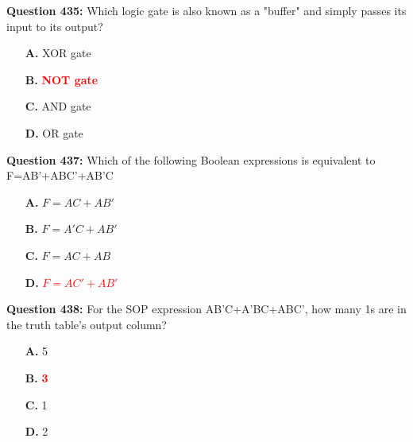 \documentclass[12pt,a4paper]{article}
\begin{document}
\vspace{0.5cm}

\vspace{0.5cm}

\textbf{Question 435:} Which logic gate is also known as a "buffer" and simply passes its input to its output?

\begin{itemize}
    \item[\textbf{A.}] XOR gate
    \item[\textbf{B.}] \textcolor{red}{\textbf{NOT gate}}
    \item[\textbf{C.}] AND gate
    \item[\textbf{D.}] OR gate
\end{itemize}

\vspace{0.5cm}

\vspace{0.5cm}

\textbf{Question 437:} Which of the following Boolean expressions is equivalent to F=AB'+ABC'+AB'C

\begin{itemize}
    \item[\textbf{A.}] $F = AC + AB'$
    \item[\textbf{B.}] $F = A'C + AB'$
    \item[\textbf{C.}] $F = AC + AB$
    \item[\textbf{D.}] \textcolor{red}{\textbf{$F = AC' + AB'$}}
\end{itemize}

\vspace{0.5cm}

\vspace{0.5cm}

\textbf{Question 438:} For the SOP expression AB'C+A'BC+ABC', how many 1s are in the truth table's output column?

\begin{itemize}
    \item[\textbf{A.}] 5
    \item[\textbf{B.}] \textcolor{red}{\textbf{3}}
    \item[\textbf{C.}] 1
    \item[\textbf{D.}] 2
\end{itemize}

\vspace{0.5cm}

\vspace{0.5cm}
\end{document}
